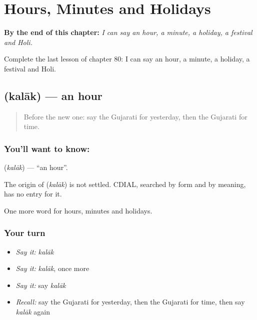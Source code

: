 
\chapter{Hours, Minutes and Holidays}
\label{ch:gu-hours-minutes-and-holidays}

\begin{chapteropening}
\textbf{By the end of this chapter:} \emph{I can say an hour, a minute, a holiday, a festival and Holi.}

Complete the last lesson of chapter 80: I can say an hour, a minute, a holiday, a festival and Holi.
\end{chapteropening}

\section[\texorpdfstring{\gu{કલાક} (kalāk)}{કલાક (kalāk)}]{ (kalāk) — an hour}

\label{lesson:GU-C80-hour}



\begin{quote}
Before the new one: say the Gujarati for yesterday, then the Gujarati for time.
\end{quote}

\subsection*{You'll want to know: }
\textbf{} (\emph{kalāk}) — \textquotedblleft{}an hour\textquotedblright{}.

\begin{cousinweb}
The origin of \textbf{} (\emph{kalāk}) is not settled. CDIAL, searched by form and by meaning, has no entry for it.
\end{cousinweb}

\begin{grammarlens}[title={What you've built}]
One more word for hours, minutes and holidays.
\end{grammarlens}

\subsection*{Your turn}
\begin{itemize}
\raggedright
  \item \emph{Say it:} \emph{kalāk}
  \item \emph{Say it:} \emph{kalāk}, once more
  \item \emph{Say it:} say \emph{kalāk}
  \item \emph{Recall:} say the Gujarati for yesterday, then the Gujarati for time, then say \emph{kalāk} again
\end{itemize}

